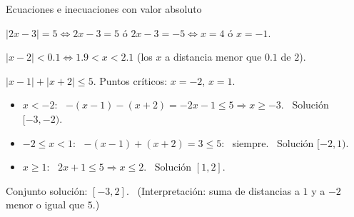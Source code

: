 \documentclass[10pt,aspectratio=169]{beamer}
\begin{document}
\begin{frame}{Ecuaciones e inecuaciones con valor absoluto}
  \begin{ejemplo}[1]
    $|2x-3|=5\iff2x-3=5$ ó $2x-3=-5\iff x=4$ ó $x=-1$.
  \end{ejemplo}
  \begin{ejemplo}[2]
    $|x-2|<0.1\iff1.9<x<2.1$ \quad (los $x$ a distancia menor que $0.1$ de $2$).
  \end{ejemplo}
  \begin{ejemplo}
    $|x-1|+|x+2|\le5$. Puntos críticos: $x=-2$, $x=1$.
    \begin{itemize}
      \item $x<-2$: \ $-(x-1)-(x+2)=-2x-1\le5\Rightarrow x\ge-3$. \ Solución $[-3,-2)$.
      \item $-2\le x<1$: \ $-(x-1)+(x+2)=3\le5$: \ siempre. \ Solución $[-2,1)$.
      \item $x\ge1$: \ $2x+1\le5\Rightarrow x\le2$. \ Solución $[1,2]$.
    \end{itemize}
    Conjunto solución: $[-3,2]$. \ (Interpretación: suma de distancias a $1$ y a $-2$ menor o igual que $5$.)
  \end{ejemplo}
\end{frame}
\end{document}

